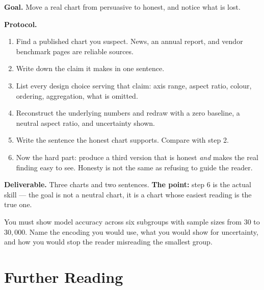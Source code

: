 \begin{practicallab}
\textbf{Goal.} Move a real chart from persuasive to honest, and notice what is
lost.

\textbf{Protocol.}
\begin{enumerate}
  \item Find a published chart you suspect. News, an annual report, and vendor
        benchmark pages are reliable sources.
  \item Write down the claim it makes in one sentence.
  \item List every design choice serving that claim: axis range, aspect ratio,
        colour, ordering, aggregation, what is omitted.
  \item Reconstruct the underlying numbers and redraw with a zero baseline, a
        neutral aspect ratio, and uncertainty shown.
  \item Write the sentence the honest chart supports. Compare with step 2.
  \item Now the hard part: produce a third version that is honest \emph{and}
        makes the real finding easy to see. Honesty is not the same as
        refusing to guide the reader.
\end{enumerate}

\textbf{Deliverable.} Three charts and two sentences. \textbf{The point:} step 6
is the actual skill --- the goal is not a neutral chart, it is a chart whose
easiest reading is the true one.
\end{practicallab}

\begin{checkpoint}
You must show model accuracy across six subgroups with sample sizes from $30$
to $30{,}000$. Name the encoding you would use, what you would show for
uncertainty, and how you would stop the reader misreading the smallest group.
\end{checkpoint}


\section{Further Reading}

